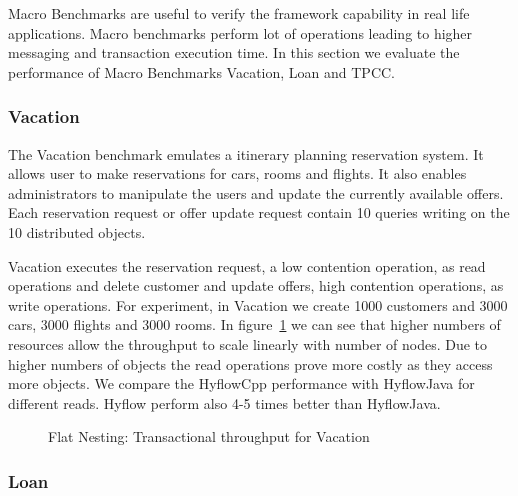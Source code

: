 \documentclass[12pt,english]{report}
\begin{document}
Macro Benchmarks are useful to verify the framework capability in real life applications. Macro benchmarks perform lot of operations leading to higher messaging and transaction execution time. In this section we evaluate the performance of Macro Benchmarks Vacation, Loan and TPCC.

\subsubsection{Vacation}

The Vacation benchmark emulates a itinerary planning reservation system. It allows user to make reservations for cars, rooms and flights. It also enables administrators to manipulate the users and update the currently available offers. Each reservation request or offer update request contain 10 queries writing on the 10 distributed objects. 

Vacation executes the reservation request, a low contention operation, as read operations and delete customer and update offers, high contention operations, as write operations. For experiment, in Vacation we create 1000 customers and 3000 cars, 3000 flights and 3000 rooms. In figure~\ref{Fig:flatVacation} we can see  that higher numbers of resources allow the throughput to scale linearly with number of nodes. Due to higher numbers of objects the read operations prove more costly as they access more objects. We compare the HyflowCpp performance with HyflowJava for different reads. Hyflow perform also 4-5 times better than HyflowJava. 

\begin{figure}[H]
\centering
{}
\end{figure}
\begin{figure}[H]
\centering
{}
\end{figure}

\begin{figure}[H]
\centering
{}
\caption{Flat Nesting: Transactional throughput for Vacation}
\label{Fig:flatVacation}
\end{figure}

\subsubsection{Loan}
\end{document}
